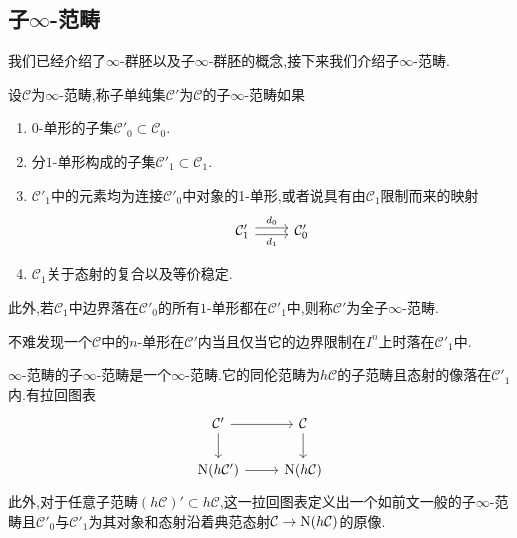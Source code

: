 \subsection{子$\infty$-范畴}
我们已经介绍了$\infty$-群胚以及子$\infty$-群胚的概念,接下来我们介绍子$\infty$-范畴.
\begin{definition}
    设$\mathcal{C}$为$\infty$-范畴,称子单纯集$\mathcal{C}'$为$\mathcal{C}$的子$\infty$-范畴如果
    \begin{enumerate}
        \item $0$-单形的子集$\mathcal{C}'_0\subset \mathcal{C}_0$.
        \item 分$1$-单形构成的子集$\mathcal{C}'_1 \subset \mathcal{C}_1$.
        \item $\mathcal{C}'_1$中的元素均为连接$\mathcal{C}'_0$中对象的1-单形,或者说具有由$\mathcal{C}_1$限制而来的映射
        \[\begin{tikzcd}
	    {\mathcal{C}'_1} & {\mathcal{C}_0'}
	    \arrow["{d_0}", shift left, from=1-1, to=1-2]
	    \arrow["{d_1}"', shift right, from=1-1, to=1-2]
        \end{tikzcd}\]
        \item $\mathcal{C}_1$关于态射的复合以及等价稳定.
    \end{enumerate}
    此外,若$\mathcal{C}_1$中边界落在$\mathcal{C}'_0$的所有$1$-单形都在$\mathcal{C}'_1$中,则称$\mathcal{C}'$为全子$\infty$-范畴.
\end{definition}
不难发现一个$\mathcal{C}$中的$n$-单形在$\mathcal{C}'$内当且仅当它的边界限制在$I^n$上时落在$\mathcal{C}'_1$中.
\begin{lemma}
    $\infty$-范畴的子$\infty$-范畴是一个$\infty$-范畴.它的同伦范畴为$h\mathcal{C}$的子范畴且态射的像落在$\mathcal{C}'_1$内.有拉回图表
    \[\begin{tikzcd}
	{\mathcal{C}'} & {\mathcal{C}} \\
	{\nerve(h\mathcal{C}')} & {\nerve(h\mathcal{C})}
	\arrow[from=1-1, to=1-2]
	\arrow[from=1-1, to=2-1]
	\arrow[from=1-2, to=2-2]
	\arrow[from=2-1, to=2-2]
    \end{tikzcd}\]
    此外,对于任意子范畴$(h\mathcal{C})'\subset h\mathcal{C}$,这一拉回图表定义出一个如前文一般的子$\infty$-范畴且$\mathcal{C}'_0$与$\mathcal{C}'_1$为其对象和态射沿着典范态射$\mathcal{C} \to \operatorname{N}(h\mathcal{C})$的原像.
\end{lemma}
